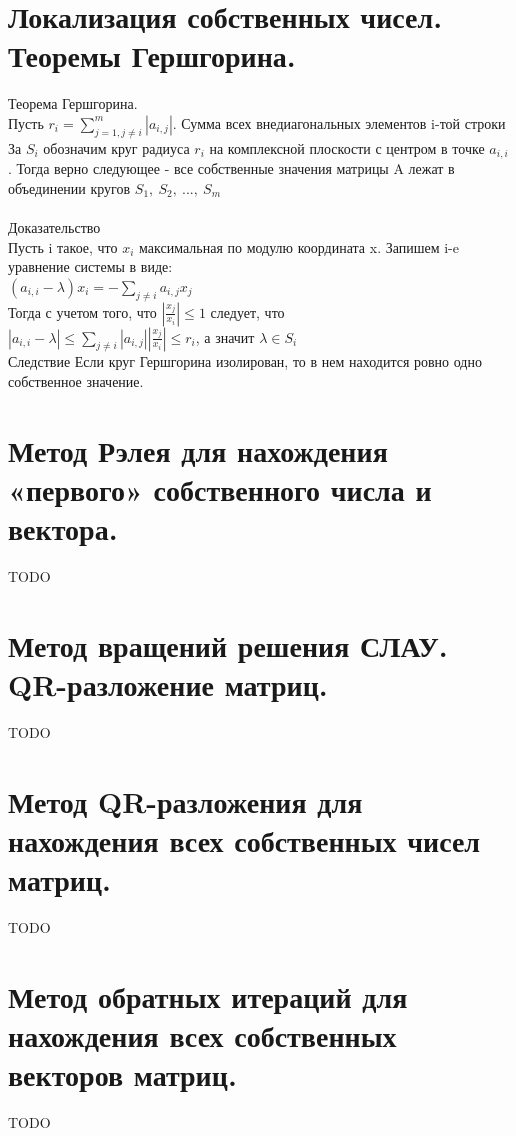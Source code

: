 \documentclass[16pt]{article}
\begin{document}
		\section{Локализация собственных чисел. Теоремы Гершгорина.}
			Теорема Гершгорина.\\
            Пусть $r_i = \sum_{j = 1, j \neq i}^{m}|a_{i,j}|$. Сумма всех внедиагональных элементов i-той строки\\
            За $S_i$ обозначим круг радиуса $r_i$ на комплексной плоскости с центром в точке $a_{i,i}$.
            Тогда верно следующее - все собственные значения матрицы A лежат в объединении кругов $S_1,\ S_2,\ ...,\ S_m$\\ \\
            Доказательство\\
            Пусть i такое, что $x_{i}$ максимальная по модулю координата x. Запишем  i-e уравнение системы в виде:\\
            $(a_{i,i}-\lambda)x_{i}=-\sum_{j\neq i} a_{i,j}x_{j}$\\
            Тогда с учетом того, что $|\frac{x_j}{x_i}|\leq 1$ следует, что\\
            $|a_{i,i}-\lambda| \leq \sum_{j\neq i} |a_{i,j}||\frac{x_{j}}{x_{i}}| \leq r_i$, а значит $\lambda \in S_{i}$\\
            Следствие
            Если круг Гершгорина изолирован, то в нем находится ровно одно собственное значение.
		\section{Метод Рэлея для нахождения «первого» собственного числа и вектора.}
			TODO
			
		\section{Метод вращений решения СЛАУ. QR-разложение матриц.}
			TODO
			
		\section{Метод QR-разложения для нахождения всех собственных чисел матриц.}
			TODO
			
		\section{Метод обратных итераций для нахождения всех собственных векторов матриц.}
			TODO
			
\end{document}
